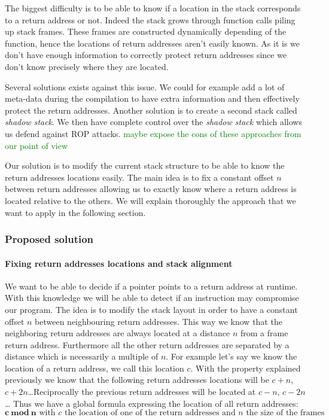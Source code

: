 \documentclass[11pt]{sdm}
\begin{document}
The biggest difficulty is to be able to know if a location in the stack corresponds to a return address or not. Indeed the stack grows through function calls piling up stack frames. 
These frames are constructed dynamically depending of the function, hence the locations of return addresses aren't easily known. As it is we don't have enough information to correctly protect return addresses since we don't know precisely where they are located.

Several solutions exists against this issue. We could for example add a lot of meta-data during the compilation to have extra information and then effectively protect the return addresses. Another solution is to create a second stack called \textit{shadow stack}. We then have complete control over the \textit{shadow stack} which allows us defend against ROP attacks.
\textcolor{green}{maybe expose the cons of these approaches from our point of view}

Our solution is to modify the current stack structure to be able to know the return addresses locations easily. The main idea is to fix a constant offset $n$ between return addresses allowing us to exactly know where a return address is located relative to the others. We will explain thoroughly the approach that we want to apply in the following section.

\subsubsection{Proposed solution}
\label{ssub:Proposed solution}

\paragraph{Fixing return addresses locations and stack alignment}
\label{par:Fixing return addresses locations}

We want to be able to decide if a pointer points to a return address at runtime. With this knowledge we will be able to detect if an instruction may compromise our program.
The idea is to modify the stack layout in order to have a constant offset $n$ between neighbouring return addresses. This way we know that the neighboring return addresses are always located at a distance $n$ from a frame return address. Furthermore all the other return addresses are separated by a distance which is necessarily a multiple of $n$.
For example let's say we know the location of a return address, we call this location $c$.
With the property explained previously we know that the following return addresses locations will be $c+n$, $c+2n$\dots Reciprocally the previous return addresses will be located at $c-n$, $c-2n$\dots
Thus we have a global formula expressing the location of all return addresses: 
$$ \mathbf{c~mod~n} \text{     with } c \text{ the location of one of the return addresses and } n \text{ the size of the frames }$$
\end{document}
